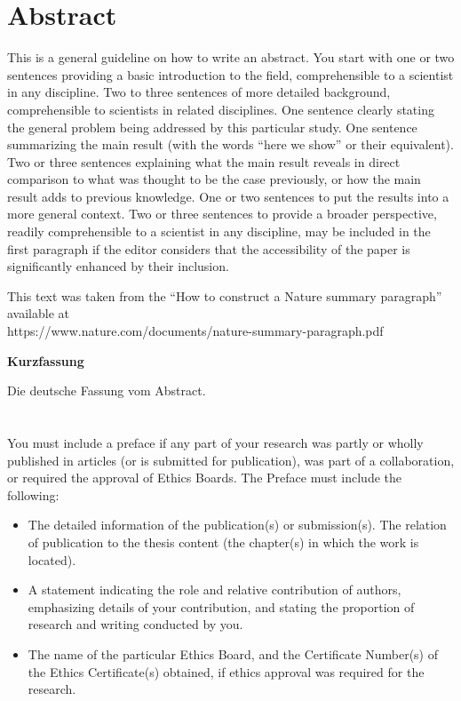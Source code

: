 
\chapter*{Abstract}
This is a general guideline on how to write an abstract. You start with one or two sentences providing a basic introduction to the field, comprehensible to a scientist in any discipline. Two to three sentences of more detailed background, comprehensible to scientists in related disciplines. One sentence clearly stating the general problem being addressed by this particular study. One sentence summarizing the main result (with the words “here we show” or their equivalent). Two or three sentences explaining what the main result reveals in direct comparison to what was thought to be the case previously, or how the main result adds to previous knowledge. One or two sentences to put the results into a more general context. Two or three sentences to provide a broader perspective, readily comprehensible to a scientist in any discipline, may be included in the first paragraph if the editor considers that the accessibility of the paper is significantly enhanced by their inclusion. 

This text was taken from the ``How to construct a Nature summary paragraph'' available at \\
https://www.nature.com/documents/nature-summary-paragraph.pdf

\newpage
\vspace*{7em}
{\noindent \Huge \bf Kurzfassung}
\vspace{4em}

\noindent Die deutsche Fassung vom Abstract.



\chapter*{\prefacename}

You must include a preface if any part of your research was partly or wholly published in articles (or is submitted for publication), was part of a collaboration, or required the approval of Ethics Boards.
The Preface must include the following:
\begin{itemize}
\item The detailed information of the publication(s) or submission(s). The relation of publication to the thesis content (the chapter(s) in which the work is located).
\item A statement indicating the role and relative contribution of authors, emphasizing details of your contribution, and stating the proportion of research and writing conducted by you. 
\item The name of the particular  Ethics Board, and the Certificate Number(s) of the Ethics Certificate(s) obtained, if ethics approval was required for the research.
\end{itemize}



